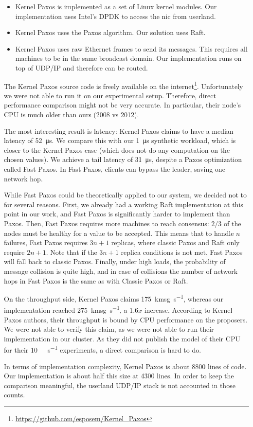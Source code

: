 \begin{itemize}
    \item Kernel Paxos is implemented as a set of Linux kernel modules.
        Our implementation uses Intel's DPDK\cite{dpdk} to access the \gls{nic} from userland.
    \item Kernel Paxos uses the Paxos algorithm.
        Our solution uses Raft.
    \item Kernel Paxos uses raw Ethernet frames to send its messages.
        This requires all machines to be in the same broadcast domain.
        Our implementation runs on top of UDP/IP and therefore can be routed.
\end{itemize}

The Kernel Paxos source code is freely available on the internet\footnote{\url{https://github.com/esposem/Kernel_Paxos}}.
Unfortunately we were not able to run it on our experimental setup.
Therefore, direct performance comparison might not be very accurate.
In particular, their node's CPU is much older than ours (2008 vs 2012).

The most interesting result is latency: Kernel Paxos claims to have a median latency of \SI{52}{\micro\second}.
We compare this with our \SI{1}{\micro\second} synthetic workload, which is closer to the Kernel Paxos case (which does not do any computation on the chosen values).
We achieve a tail latency of \SI{31}{\micro\second}, despite a Paxos optimization called Fast Paxos\cite{lamport2006fast}.
In Fast Paxos, clients can bypass the leader, saving one network hop.

While Fast Paxos could be theoretically applied to our system, we decided not to for several reasons.
First, we already had a working Raft implementation at this point in our work, and Fast Paxos is significantly harder to implement than Paxos.
Then, Fast Paxos requires more machines to reach consensus: $2/3$ of the nodes must be healthy for a value to be accepted.
This means that to handle $n$ failures, Fast Paxos requires $3n + 1$ replicas, where classic Paxos and Raft only require $2n + 1$.
Note that if the $3n + 1$ replica conditions is not met, Fast Paxos will fall back to classic Paxos.
Finally, under high loads, the probability of message collision is quite high, and in case of collisions the number of network hops in Fast Paxos is the same as with Classic Paxos or Raft.

On the throughput side, Kernel Paxos claims \SI{175}{\kilo msg\per\second}, whereas our implementation reached \SI{275}{\kilo msg\per\second}, a $1.6x$ increase.
According to Kernel Paxos authors, their throughput is bound by CPU performance on the proposers.
We were not able to verify this claim, as we were not able to run their implementation in our cluster.
As they did not publish the model of their CPU for their \SI{10}{\giga\bit\per\second} experiments, a direct comparison is hard to do.

In terms of implementation complexity, Kernel Paxos is about 8800 lines of code.
Our implementation is about half this size at 4300 lines.
In order to keep the comparison meaningful, the userland UDP/IP stack is not accounted in those counts.
